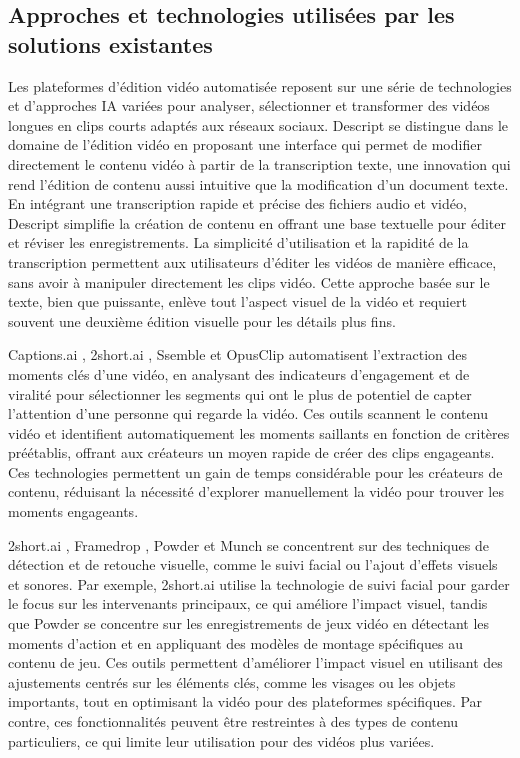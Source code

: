 \subsection{Approches et technologies utilisées par les solutions existantes}
Les plateformes d’édition vidéo automatisée reposent sur une série de technologies et d’approches IA variées pour analyser, sélectionner et transformer des vidéos longues en clips courts adaptés aux réseaux sociaux. Descript \cite{descript2024} se distingue dans le domaine de l’édition vidéo en proposant une interface qui permet de modifier directement le contenu vidéo à partir de la transcription texte, une innovation qui rend l’édition de contenu aussi intuitive que la modification d’un document texte. En intégrant une transcription rapide et précise des fichiers audio et vidéo, Descript simplifie la création de contenu en offrant une base textuelle pour éditer et réviser les enregistrements. La simplicité d’utilisation et la rapidité de la transcription permettent aux utilisateurs d’éditer les vidéos de manière efficace, sans avoir à manipuler directement les clips vidéo. Cette approche basée sur le texte, bien que puissante, enlève tout l’aspect visuel de la vidéo et requiert souvent une deuxième édition visuelle pour les détails plus fins.

Captions.ai \cite{captions2024}, 2short.ai \cite{short2024}, Ssemble \cite{ssemble2024} et OpusClip \cite{opusclip2024} automatisent l’extraction des moments clés d’une vidéo, en analysant des indicateurs d’engagement et de viralité pour sélectionner les segments qui ont le plus de potentiel de capter l’attention d’une personne qui regarde la vidéo. Ces outils scannent le contenu vidéo et identifient automatiquement les moments saillants en fonction de critères préétablis, offrant aux créateurs un moyen rapide de créer des clips engageants. Ces technologies permettent un gain de temps considérable pour les créateurs de contenu, réduisant la nécessité d’explorer manuellement la vidéo pour trouver les moments engageants.

2short.ai \cite{short2024}, Framedrop \cite{framedrop2024}, Powder \cite{powder2024} et Munch \cite{munch2024} se concentrent sur des techniques de détection et de retouche visuelle, comme le suivi facial ou l’ajout d’effets visuels et sonores. Par exemple, 2short.ai utilise la technologie de suivi facial pour garder le focus sur les intervenants principaux, ce qui améliore l’impact visuel, tandis que Powder \cite{powder2024} se concentre sur les enregistrements de jeux vidéo en détectant les moments d’action et en appliquant des modèles de montage spécifiques au contenu de jeu. Ces outils permettent d’améliorer l’impact visuel en utilisant des ajustements centrés sur les éléments clés, comme les visages ou les objets importants, tout en optimisant la vidéo pour des plateformes spécifiques. Par contre, ces fonctionnalités peuvent être restreintes à des types de contenu particuliers, ce qui limite leur utilisation pour des vidéos plus variées.

